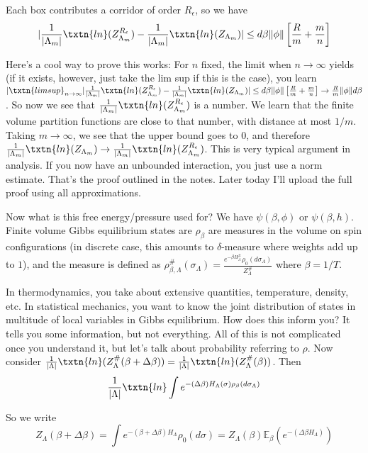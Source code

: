 Each box contributes a corridor of order $R_{\epsilon}$, so we have 
\[
|\frac{1}{|\Lambda_m|}\txtn{ln}(Z_{\Lambda_m}^{R_{\epsilon}})  - \frac{1}{|\Lambda_m|}\txtn{ln}(Z_{\Lambda_m})| \leq d\beta \|\phi\| \left[ \frac{R}{m} + \frac{m}{n} \right]
\]

Here's a cool way to prove this works: For $n$ fixed, the limit when $n \to \infty$ yields (if it exists, however, just take the lim sup if this is the case), you learn $|\txtn{lim sup}_{n \to \infty}  |\frac{1}{|\Lambda_m|}\txtn{ln}(Z_{\Lambda_m}^{R_{\epsilon}})  - \frac{1}{|\Lambda_m|}\txtn{ln}(Z_{\Lambda_m})| \leq d\beta \|\phi\| \left[ \frac{R}{m} + \frac{m}{n} \right] \to \frac{R}{m}\|\phi\|d\beta$. So now we see that $\frac{1}{|\Lambda_m|}\txtn{ln}(Z_{\Lambda_m}^{R_{\epsilon}})$ is a number. We learn that the finite volume partition functions are close to that number, with distance at most $1/m$. Taking $m \to \infty$, we see that the upper bound goes to $0$, and therefore $\frac{1}{|\Lambda_m|}\txtn{ln}(Z_{\Lambda_m}) \to \frac{1}{|\Lambda_m|}\txtn{ln}(Z_{\Lambda_m}^{R_{\epsilon}})$. This is very typical argument in analysis. If you now have an unbounded interaction, you just use a norm estimate. That's the proof outlined in the notes. Later today I'll upload the full proof using all approximations. 

Now what is this free energy/pressure used for? We have $\psi(\beta, \phi)$  or $\psi(\beta, h)$. Finite volume Gibbs equilibrium states are $\rho_{\beta}$ are measures in the volume on spin configurations (in discrete case, this amounts to $\delta$-measure where weights add up to $1$), and the measure is defined as $\rho_{\beta, \Lambda}^{\#}(\sigma_{\Lambda}) = \frac{e^{-\beta H_{\Lambda}^{\#}}\rho_0(d\sigma_{\Lambda})}{Z_{\Lambda}^{\#}}$ where $\beta = 1/T$. 

In thermodynamics, you take about extensive quantities, temperature, density, etc. In statistical mechanics, you want to know the joint distribution of states in multitude of local variables in Gibbs equilibrium. How does this inform you? It tells you some information, but not everything. All of this is not complicated once you understand it, but let's talk about probability referring to $\rho$. Now consider $\frac{1}{|\Lambda|} \txtn{ln}(Z_{\Lambda}^{\#}(\beta + \Delta \beta)) = \frac{1}{|\Lambda|} \txtn{ln}(Z_{\Lambda}^{\#}(\beta))$. Then 
\[
\frac{1}{|\Lambda|} \txtn{ln} \int e^{-(\Delta\beta)H_{\Lambda}(\sigma) \rho_{\beta}(d\sigma_{\Lambda})}
\]

So we write 
\[
Z_{\Lambda}(\beta + \Delta \beta) = \int e^{-(\beta + \Delta \beta)H_{\Lambda}}\rho_0(d\sigma) = Z_{\Lambda}(\beta) \mathbb{E}_{\beta}(e^{-(\Delta \beta H_{\Lambda})})
\]

